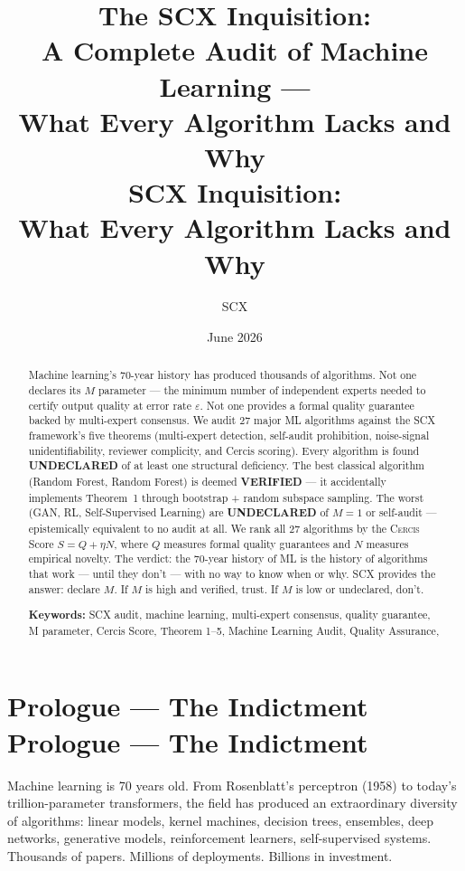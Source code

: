 \documentclass[12pt,a4paper]{article}
\title{\textbf{The SCX Inquisition:}\\[4pt]
       \large A Complete Audit of Machine Learning ---\\[2pt]
       What Every Algorithm Lacks and Why\\[8pt]
       \normalsize \textbf{SCX Inquisition:\\
       What Every Algorithm Lacks and Why}}
\author{SCX}
\date{June 2026}
\theoremstyle{definition}
\newcommand{\Cercis}{\textsc{Cercis}}
\newcommand{\SCX}{\textsc{SCX}}
\begin{document}
\maketitle

\begin{abstract}
\noindent
Machine learning's 70-year history has produced thousands of algorithms. Not one declares its $M$ parameter — the minimum number of independent experts needed to certify output quality at error rate $\varepsilon$. Not one provides a formal quality guarantee backed by multi-expert consensus. We audit 27 major ML algorithms against the \SCX{} framework's five theorems (multi-expert detection, self-audit prohibition, noise-signal unidentifiability, reviewer complicity, and Cercis scoring). Every algorithm is found \textbf{UNDECLARED} of at least one structural deficiency. The best classical algorithm (Random Forest, Random Forest) is deemed \textbf{VERIFIED} — it accidentally implements Theorem~1 through bootstrap + random subspace sampling. The worst (GAN, RL, Self-Supervised Learning) are \textbf{UNDECLARED} of $M=1$ or self-audit — epistemically equivalent to no audit at all. We rank all 27 algorithms by the \Cercis{} Score $S = Q + \eta N$, where $Q$ measures formal quality guarantees and $N$ measures empirical novelty. The verdict: the 70-year history of ML is the history of algorithms that work — until they don't — with no way to know when or why. \SCX{} provides the answer: declare $M$. If $M$ is high and verified, trust. If $M$ is low or undeclared, don't.

\medskip

\medskip
\noindent\textbf{Keywords:} SCX audit, machine learning, multi-expert consensus, quality guarantee, M parameter, Cercis Score, Theorem 1--5, Machine Learning Audit, Quality Assurance, 
\end{abstract}

\section{Prologue — The Indictment Prologue --- The Indictment}
\label{sec:prologue}

Machine learning is 70 years old. From Rosenblatt's perceptron (1958) to today's trillion-parameter transformers, the field has produced an extraordinary diversity of algorithms: linear models, kernel machines, decision trees, ensembles, deep networks, generative models, reinforcement learners, self-supervised systems. Thousands of papers. Millions of deployments. Billions in investment.
\end{document}
